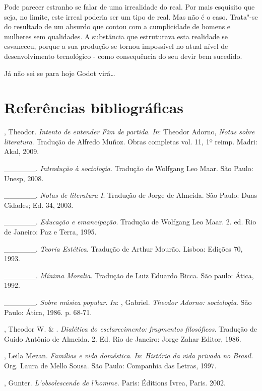 Pode parecer estranho se falar de uma irrealidade do real. Por mais
esquisito que seja, no limite, este irreal poderia ser um tipo de real.
Mas não é o caso. Trata"-se do resultado de um absurdo que contou com a
cumplicidade de homens e mulheres sem qualidades. A substância que
estruturava esta realidade se esvaneceu, porque a sua produção se tornou
impossível no atual nível de desenvolvimento tecnológico - como
consequência do seu devir bem sucedido.

Já não sei se para hoje Godot virá\ldots{}

\chapter{Referências bibliográficas}


\begin{Parskip}
, Theodor. \emph{Intento de entender Fim de partida}. \emph{In}: Theodor
Adorno, \emph{Notas sobre literatura}. Tradução de Alfredo Muñoz. Obras
completas vol. 11, 1º reimp. Madri: Akal, 2009.

\_\_\_\_\_\_. \emph{Introdução à sociologia}. Tradução de Wolfgang Leo
Maar. São Paulo: Unesp, 2008.

\_\_\_\_\_\_. \emph{Notas de literatura I}. Tradução de Jorge de
Almeida. São Paulo: Duas Cidades; Ed. 34, 2003.

\_\_\_\_\_\_. \emph{Educação e emancipação}. Tradução de Wolfgang Leo
Maar. 2. ed. Rio de Janeiro: Paz e Terra, 1995.

\_\_\_\_\_\_. \emph{Teoria Estética}. Tradução de Arthur Mourão.
Lisboa: Edições 70, 1993.

\_\_\_\_\_\_. \emph{Mínima Moralia}. Tradução de Luiz Eduardo Bicca.
São paulo: Ática, 1992.

\_\_\_\_\_\_. \emph{Sobre música popular}. \emph{In}: , Gabriel. \emph{Theodor
Adorno: sociologia}. São Paulo: Ática, 1986. p. 68-71.

, Theodor W. \& . \emph{Dialética do esclarecimento:
fragmentos filosóficos}. Tradução de Guido Antônio de Almeida. 2. Ed.
Rio de Janeiro: Jorge Zahar Editor, 1986.

, Leila Mezan. \emph{Famílias e vida doméstica}. \emph{In}:
\emph{História da vida privada no Brasil.} Org. Laura de Mello Sousa.
São Paulo: Companhia das Letras, 1997.

, Gunter. \emph{L'obsolescende de l'homme.} Paris: Éditions
Ivrea, Paris. 2002.


\end{Parskip}
